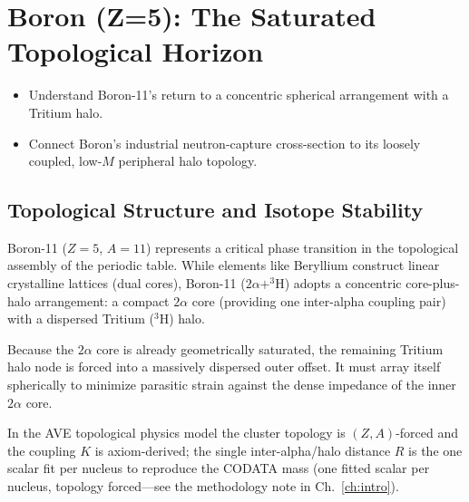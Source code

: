 \chapter{Boron (Z=5): The Saturated Topological Horizon}
\label{ch:boron}


\begin{objectivebox}
\begin{itemize}
    \item Understand Boron-11's return to a concentric spherical arrangement with a Tritium halo.
    \item Connect Boron's industrial neutron-capture cross-section to its loosely coupled, low-$M$ peripheral halo topology.
\end{itemize}
\end{objectivebox}

\section{Topological Structure and Isotope Stability}
Boron-11 ($Z=5$, $A=11$) represents a critical phase transition in the topological assembly of the periodic table. While elements like Beryllium construct linear crystalline lattices (dual cores), Boron-11 ($2\alpha + ^3\text{H}$) adopts a concentric core-plus-halo arrangement: a compact $2\alpha$ core (providing one inter-alpha coupling pair) with a dispersed Tritium ($^3$H) halo.

Because the $2\alpha$ core is already geometrically saturated, the remaining Tritium halo node is forced into a massively dispersed outer offset. It must array itself spherically to minimize parasitic strain against the dense impedance of the inner $2\alpha$ core.

In the AVE topological physics model the cluster topology is $(Z,A)$-forced and the coupling $K$ is axiom-derived; the single inter-alpha/halo distance $R$ is the one scalar fit per nucleus to reproduce the CODATA mass (one fitted scalar per nucleus, topology forced---see the methodology note in Ch.~\ref{ch:intro}).

